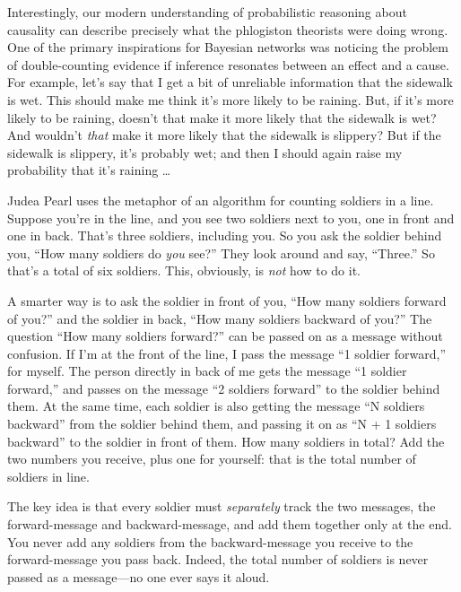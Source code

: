 {
 Interestingly, our modern understanding of probabilistic reasoning
about causality can describe precisely what the phlogiston theorists
were doing wrong. One of the primary inspirations for Bayesian networks
was noticing the problem of double-counting evidence if inference
resonates between an effect and a cause. For example,
let's say that I get a bit of unreliable information
that the sidewalk is wet. This should make me think
it's more likely to be raining. But, if
it's more likely to be raining, doesn't
that make it more likely that the sidewalk is wet? And
wouldn't \textit{that} make it more likely that the
sidewalk is slippery? But if the sidewalk is slippery,
it's probably wet; and then I should again raise my
probability that it's raining \ldots}

{
 Judea Pearl uses the metaphor of an algorithm for counting
soldiers in a line. Suppose you're
in the line, and you see two soldiers next to you, one in front and one
in back. That's three soldiers, including you. So you
ask the soldier behind you, ``How many soldiers do
\textit{you} see?'' They look around and say,
``Three.'' So that's
a total of six soldiers. This, obviously, is \textit{not} how to do
it.}

{
 A smarter way is to ask the soldier in front of you,
``How many soldiers forward of
you?'' and the soldier in back,
``How many soldiers backward of
you?'' The question ``How many
soldiers forward?'' can be passed on as a message
without confusion. If I'm at the front of the line, I
pass the message ``1 soldier
forward,'' for myself. The person directly in back of
me gets the message ``1 soldier
forward,'' and passes on the message
``2 soldiers forward'' to the
soldier behind them. At the same time, each soldier is also getting the
message ``N soldiers backward'' from
the soldier behind them, and passing it on as ``N + 1
soldiers backward'' to the soldier in front of them.
How many soldiers in total? Add the two numbers you receive, plus one
for yourself: that is the total number of soldiers in line.}

{
 The key idea is that every soldier must \textit{separately} track
the two messages, the forward-message and backward-message, and add
them together only at the end. You never add any soldiers from the
backward-message you receive to the forward-message you pass back.
Indeed, the total number of soldiers is never passed as a message---no
one ever says it aloud.}


